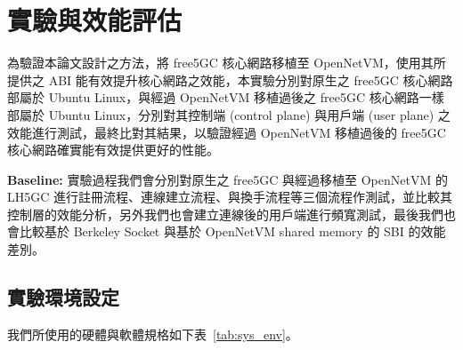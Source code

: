 \chapter{實驗與效能評估}
\label{chapter:evaluation}


為驗證本論文設計之方法，將 free5GC 核心網路移植至 OpenNetVM，使用其所提供之 ABI 能有效提升核心網路之效能，本實驗分別對原生之 free5GC 核心網路部屬於 Ubuntu Linux，與經過 OpenNetVM 移植過後之 free5GC 核心網路一樣部屬於 Ubuntu Linux，分別對其控制端 (control plane) 與用戶端 (user plane) 之效能進行測試，最終比對其結果，以驗證經過 OpenNetVM 移植過後的 free5GC 核心網路確實能有效提供更好的性能。

\textbf{Baseline:} 實驗過程我們會分別對原生之 free5GC 與經過移植至 OpenNetVM 的 LH5GC 進行註冊流程、連線建立流程、與換手流程等三個流程作測試，並比較其控制層的效能分析，另外我們也會建立連線後的用戶端進行頻寬測試，最後我們也會比較基於 Berkeley Socket 與基於 OpenNetVM shared memory 的 SBI 的效能差別。

\section{實驗環境設定}
\label{sec:evaluation_env}

我們所使用的硬體與軟體規格如下表~\ref{tab:sys_env}。 


